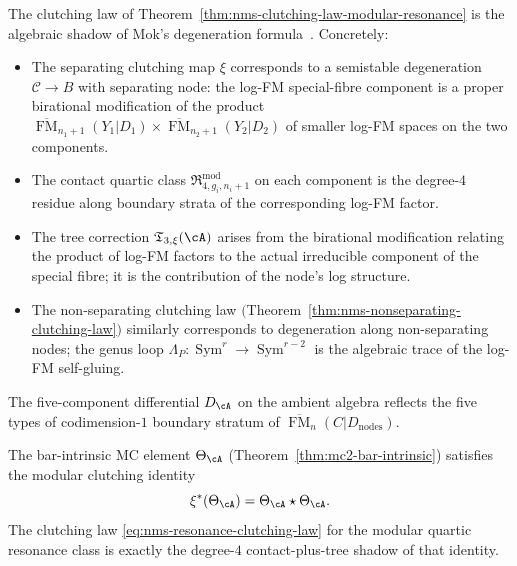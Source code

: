 \begin{remark}
\label{rem:nms-log-fm-clutching}%
%
%
The clutching law of
Theorem~\ref{thm:nms-clutching-law-modular-resonance} is the algebraic
shadow of Mok's degeneration formula~\cite[Corollary~5.3.4]{Mok25}.
Concretely:
\begin{itemize}
\item The separating clutching map $\xi$ corresponds to a semistable
 degeneration $\mathcal{C} \to B$ with separating node: the log-FM
 special-fibre component is a proper birational modification of the
 product
 $\overline{\operatorname{FM}}_{n_1+1}(Y_1|D_1)
 \times \overline{\operatorname{FM}}_{n_2+1}(Y_2|D_2)$
 of smaller log-FM spaces on the two components.
\item The contact quartic class $\mathfrak{R}_{4,g_i,n_i+1}^{\mathrm{mod}}$
 on each component is the degree-$4$ residue along boundary strata of the
 corresponding log-FM factor.
\item The tree correction $\mathfrak{T}_{3,\xi}(\cA)$ arises from
 the birational modification relating the product of log-FM factors
 to the actual irreducible component of the special fibre; it is the
 contribution of the node's log structure.
\item The non-separating clutching law
 $($Theorem~\textup{\ref{thm:nms-nonseparating-clutching-law}}$)$
 similarly corresponds to degeneration along non-separating nodes;
 the genus loop $\Lambda_P\colon \operatorname{Sym}^r \to
 \operatorname{Sym}^{r-2}$ is the algebraic trace of the log-FM
 self-gluing.
\end{itemize}
The five-component differential $D_\cA$ on the ambient algebra
reflects the five types of codimension-$1$ boundary stratum of
$\overline{\operatorname{FM}}_n(C|D_{\mathrm{nodes}})$.
\end{remark}

\begin{theorem}
\label{thm:nms-first-nonlinear-shadow-theta}
The bar-intrinsic MC element $\Theta_{\cA}$ \textup{(}Theorem~\textup{\ref{thm:mc2-bar-intrinsic})} satisfies the modular clutching identity
\[
\xi^*(\Theta_{\cA})=\Theta_{\cA}\star \Theta_{\cA}.
\]
The clutching law \eqref{eq:nms-resonance-clutching-law} for the modular quartic resonance class is exactly the degree-$4$ contact-plus-tree shadow of that identity.
\end{theorem}

